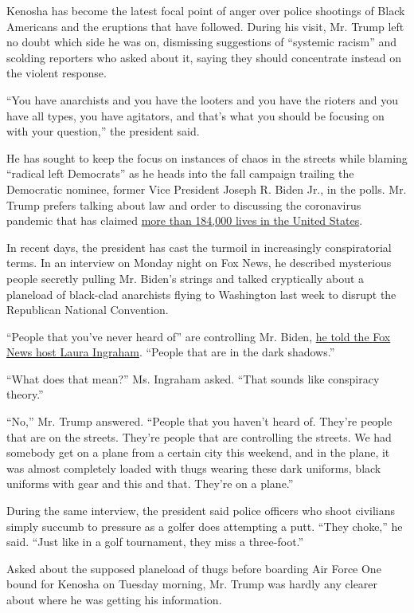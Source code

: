 Kenosha has become the latest focal point of anger over police shootings
of Black Americans and the eruptions that have followed. During his
visit, Mr. Trump left no doubt which side he was on, dismissing
suggestions of ``systemic racism'' and scolding reporters who asked
about it, saying they should concentrate instead on the violent
response.

``You have anarchists and you have the looters and you have the rioters
and you have all types, you have agitators, and that's what you should
be focusing on with your question,'' the president said.

He has sought to keep the focus on instances of chaos in the streets
while blaming ``radical left Democrats'' as he heads into the fall
campaign trailing the Democratic nominee, former Vice President Joseph
R. Biden Jr., in the polls. Mr. Trump prefers talking about law and
order to discussing the coronavirus pandemic that has claimed
\href{https://www.nytimes3xbfgragh.onion/interactive/2020/us/coronavirus-us-cases.html}{more
than 184,000 lives in the United States}.

In recent days, the president has cast the turmoil in increasingly
conspiratorial terms. In an interview on Monday night on Fox News, he
described mysterious people secretly pulling Mr. Biden's strings and
talked cryptically about a planeload of black-clad anarchists flying to
Washington last week to disrupt the Republican National Convention.

``People that you've never heard of'' are controlling Mr. Biden,
\href{https://www.youtube.com/watch?v=BqIKDb46Pfc}{he told the Fox News
host Laura Ingraham}. ``People that are in the dark shadows.''

``What does that mean?'' Ms. Ingraham asked. ``That sounds like
conspiracy theory.''

``No,'' Mr. Trump answered. ``People that you haven't heard of. They're
people that are on the streets. They're people that are controlling the
streets. We had somebody get on a plane from a certain city this
weekend, and in the plane, it was almost completely loaded with thugs
wearing these dark uniforms, black uniforms with gear and this and that.
They're on a plane.''

During the same interview, the president said police officers who shoot
civilians simply succumb to pressure as a golfer does attempting a putt.
``They choke,'' he said. ``Just like in a golf tournament, they miss a
three-foot.''

Asked about the supposed planeload of thugs before boarding Air Force
One bound for Kenosha on Tuesday morning, Mr. Trump was hardly any
clearer about where he was getting his information.

